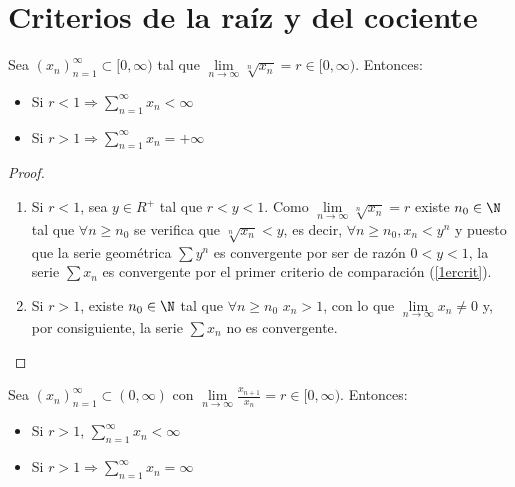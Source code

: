 \section{Criterios de la raíz y del cociente}
\begin{theorem}
	Sea \((x_n)^{\infty}_{n=1} \subset [0,\infty)\) tal que \(\lim\limits_{n \to \infty} \sqrt[n]{x_n} = r \in [0,\infty) \). Entonces:
	\begin{itemize}
		\item Si \(r < 1 \Rightarrow \sum_{n =1}^{\infty} x_n < \infty \)
		\item Si \(r > 1 \Rightarrow \sum_{n =1}^{\infty} x_n = +\infty\)
	\end{itemize}
\end{theorem}
\begin{proof}
	\begin{enumerate}
		\item Si \(r< 1\), sea \(y \in R^{+ }\) tal que \(r < y < 1 \). Como \(\lim\limits_{n \to \infty} \sqrt[n]{x_n} = r \) existe \(n_0 \in \N\) tal que \(\forall n \geq n_0\) se verifica que \(\sqrt[n]{x_n} <y\), es decir, \(\forall n \geq n_0, x_n < y^{n}\) y puesto que la serie geométrica \(\sum y^{n }\) es convergente por ser de razón \(0 < y < 1\), la serie \(\sum x_n 	\) es convergente por el primer criterio de comparación (\ref{1ercrit}).
		\item Si \(r > 1 \), existe \(n_0 \in \N\) tal que \(\forall n \geq n_0\) \(x_n > 1\), con lo que \(\lim\limits_{n  \to \infty} x_n \neq 0\) y, por consiguiente, la serie \(\sum x_{n } \) no es convergente.
	\end{enumerate}
\end{proof}
\begin{theorem}
	Sea \((x_n)^{\infty}_{n=1} \subset (0, \infty)\) con \(\lim\limits_{n \to \infty} \frac{x_{n+1}}{x_n } = r \in [0,\infty)\). Entonces:
	\begin{itemize}
		\item Si \(r > 1 \), \(\sum_{n =1}^{\infty} x_n < \infty\)
		\item Si \(r > 1 \Rightarrow \sum_{n =1}^{\infty} x_n = \infty \)
	\end{itemize}
\end{theorem}
